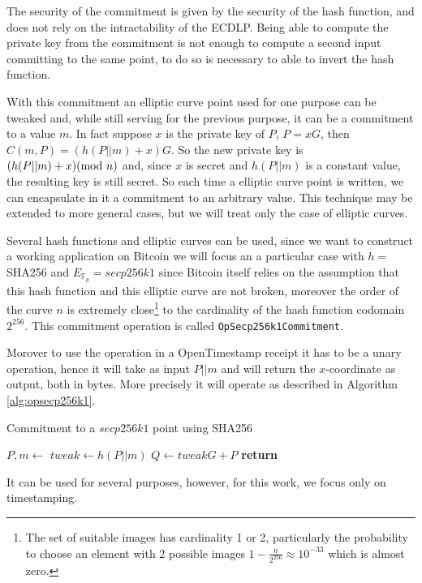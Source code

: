 The security of the commitment is given by the security of the hash function, and does not rely on the intractability of the ECDLP. Being able to compute the private key from the commitment is not enough to compute a second input committing to the same point, to do so is necessary to able to invert the hash function.

With this commitment an elliptic curve point used for one purpose can be tweaked and, while still serving for the previous purpose, it can be a commitment to a value $m$. In fact suppose $x$ is the private key of $P$, $P=xG$, then $C(m,P)=(h(P||m)+x)G$. So the new private key is $(h(P||m)+x) (\textmd{mod } n)$ and, since $x$ is secret and $h(P||m)$ is a constant value, the resulting key is still secret.
So each time a elliptic curve point is written, we can encapsulate in it a commitment to an arbitrary value.
This technique may be extended to more general cases, but we will treat only the case of elliptic curves.

Several hash functions and elliptic curves can be used, since we want to construct a working application on Bitcoin we will focus an a particular case with $h=$ SHA256 and $E_{\mathbb{F}_p}=secp256k1$ since Bitcoin itself relies on the assumption that this hash function and this elliptic curve are not broken, moreover the order of the curve $n$ is extremely close\footnote{The set of suitable images has cardinality 1 or 2, particularly the probability to choose an element with 2 possible images $1-\frac{n}{2^{256}}\approx10^{-33}$ which is almost zero.} 
to the cardinality of the hash function codomain $2^{256}$. This commitment operation is called \verb|OpSecp256k1Commitment|.

Morover to use the operation in a OpenTimestamp receipt it has to be a unary operation, hence it will take as input $P||m$ and will return the $x$-coordinate as output, both in bytes. More precisely it will operate as described in Algorithm \ref{alg:opsecp256k1}.
\begin{algorithm}
	\caption{Commitment to a $secp256k1$ point using SHA256}
	\label{alg:opsecp256k1}
	\begin{algorithmic}[1]
	\State $P,m \gets$ 
	\State $tweak \gets h(P||m)$
	\State $Q \gets tweak G + P$
	\State \textbf{return} 
	\EndProcedure
	\end{algorithmic}
\end{algorithm}
It can be used for several purposes, however, for this work, we focus only on timestamping.

